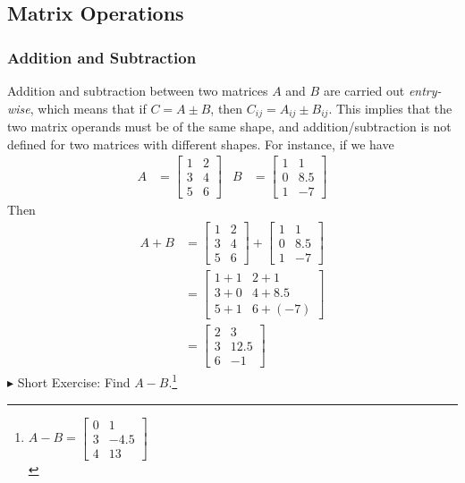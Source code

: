 \subsection{Matrix Operations}

\subsubsection{Addition and Subtraction}
Addition and subtraction between two matrices $A$ and $B$ are carried out \textit{entry-wise}, which means that if $C = A \pm B$, then $C_{ij} = A_{ij} \pm B_{ij}$. This implies that the two matrix operands must be of the same shape, and addition/subtraction is not defined for two matrices with different shapes. For instance, if we have
\begin{align*}
A &=
\begin{bmatrix}
1 & 2 \\
3 & 4 \\
5 & 6
\end{bmatrix} &
B &= 
\begin{bmatrix}
1 & 1 \\
0 & 8.5 \\
1 & -7
\end{bmatrix}
\end{align*}
Then
\begin{align*}
A+B &= 
\begin{bmatrix}
1 & 2 \\
3 & 4 \\
5 & 6
\end{bmatrix}
+
\begin{bmatrix}
1 & 1 \\
0 & 8.5 \\
1 & -7
\end{bmatrix} \\
&= 
\begin{bmatrix}
1+1 & 2+1 \\
3+0 & 4+8.5 \\
5+1 & 6+(-7)
\end{bmatrix} \\
&= 
\begin{bmatrix}
2 & 3 \\
3 & 12.5 \\
6 & -1
\end{bmatrix}
\end{align*}
$\blacktriangleright$ Short Exercise: Find $A-B$.\footnote{$A-B = \begin{bmatrix}
0 & 1 \\
3 & -4.5 \\
4 & 13
\end{bmatrix}$\\}

